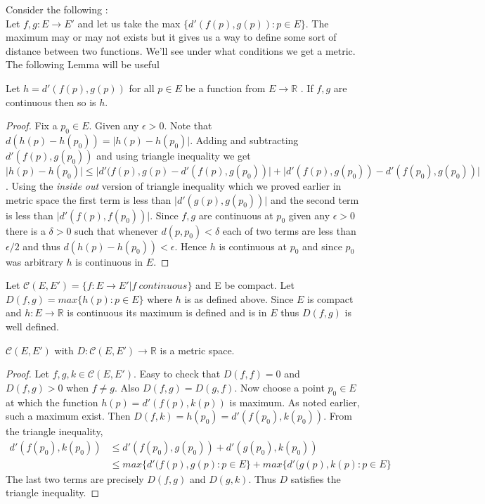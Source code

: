 Consider the following : \\
Let $f,g : E \to E'$ and let us take the max $\left.\lbrace d'(f(p),g(p)) : p \in E
\rbrace\right.$. The maximum may or may not exists but it gives us a way to define some sort of
distance between two functions. We'll see under what conditions we get a metric. The following Lemma
will be useful 
\begin{Lemma}
    Let $ h = d'(f(p),g(p))$ for all $p \in E$ be a function from $E \to \mathbb{R}$ .
    If $f,g$ are continuous then so is $h$.
\end{Lemma}
\begin{proof}
    Fix a $p_0 \in E$. Given any $\epsilon > 0$. Note that $d(h(p) - h(p_0)) = \lvert h(p) - h(p_0)
    \rvert$. Adding and subtracting $d'(f(p),g(p_0))$ and using triangle inequality we get $\lvert
    h(p) - h(p_0) \rvert \leq \lvert d'(f(p),g(p) - d'(f(p) , g(p_0)) \rvert + \lvert d'(f(p),g(p_0))
    - d'(f(p_0),g(p_0)) \rvert$. Using the \emph{inside out} version of triangle inequality which we
    proved earlier in metric space the first term is less than $\lvert d'(g(p),g(p_0)) \rvert$ and
    the second term is less than $\lvert d'(f(p),f(p_0)) \rvert.$ Since $f,g$ are continuous at
    $p_0$ given any $\epsilon > 0$ there is a $\delta > 0$ such that whenever $d(p,p_0) < \delta$ 
    each of two terms are less than $\epsilon / 2$ and thus $d(h(p) - h(p_0)) < \epsilon $. Hence
    $h$ is continuous at $p_0$ and since $p_0$ was arbitrary $h$ is continuous in $E$.
\end{proof}
Let $\mathcal{C}\left(E,E'\right) = \left.\lbrace f : E \to E' | f \ continuous \rbrace \right.$ and
E be compact. Let $D(f,g) = max\left.\lbrace h(p) : p \in E\rbrace\right.$ where $h$ is as defined
above. Since $E$ is compact and $h : E \to \mathbb{R}$ is continuous its maximum is defined and is
in $E$ thus $D(f,g)$ is well defined. 
\begin{Theorem}[name=The space of continuous functions $\mathcal{C}$]
    $\mathcal{C}\left(E,E'\right)$ with $D : \mathcal{C}\left(E,E'\right) \to \mathbb{R}$ is a
    metric space.
\end{Theorem}
\begin{proof}
    Let $f,g,k \in \mathcal{C}\left(E,E'\right)$. Easy to check that $D(f,f) = 0$ and $D(f,g) > 0$ 
    when $f \neq g$. Also $D(f,g) = D(g,f)$. Now choose a point $p_0 \in E$ at which the function
    $h(p) = d'(f(p),k(p))$ is maximum. As noted earlier, such a maximum exist. Then $D(f,k) =
    h(p_0) = d'(f(p_0),k(p_0))$. From the triangle inequality, 
    \begin{displaymath}
	\begin{aligned}
	    d'(f(p_0),k(p_0)) & \leq d'(f(p_0),g(p_0)) + d'(g(p_0),k(p_0)) \\
	    & \leq max\left.\lbrace d'(f(p),g(p) : p \in E \rbrace\right. + 
	    max\left.\lbrace d'(g(p),k(p) : p \in E \rbrace\right.
	\end{aligned}
    \end{displaymath}
    The last two terms are precisely $D(f,g)$ and $D(g,k)$. Thus $D$ satisfies the triangle
    inequality.
\end{proof}
